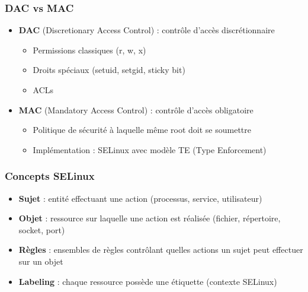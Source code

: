 \documentclass[12pt,a4paper]{article}
\begin{document}

\subsubsection{DAC vs MAC}
\begin{itemize}
    \item \textbf{DAC} (Discretionary Access Control) : contr\^ole d'acc\`es discr\'etionnaire
    \begin{itemize}
        \item Permissions classiques (r, w, x) %
        \item Droits sp\'eciaux (setuid, setgid, sticky bit) %
        \item ACLs %
    \end{itemize}
    \item \textbf{MAC} (Mandatory Access Control) : contr\^ole d'acc\`es obligatoire
    \begin{itemize}
        \item Politique de s\'ecurit\'e \`a laquelle m\^eme root doit se soumettre %
        \item Impl\'ementation : SELinux avec mod\`ele TE (Type Enforcement) %
    \end{itemize}
\end{itemize}

\subsubsection{Concepts SELinux}
\begin{itemize}
    \item \textbf{Sujet} : entit\'e effectuant une action (processus, service, utilisateur)
    \item \textbf{Objet} : ressource sur laquelle une action est r\'ealis\'ee (fichier, r\'epertoire, socket, port)
    \item \textbf{R\`egles} : ensembles de r\`egles contr\^olant quelles actions un sujet peut effectuer sur un objet
    \item \textbf{Labeling} : chaque ressource poss\`ede une \'etiquette (contexte SELinux)
\end{itemize}
\end{document}
